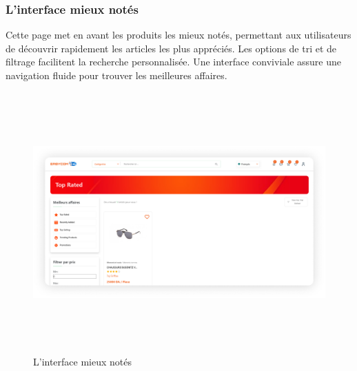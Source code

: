 \documentclass[edit,12pt,a4paper,ChapStyle,oneside,doubleinterligne]{report}
\begin{document}
\subsubsection{L'interface mieux notés}
Cette page met en avant les produits les mieux notés, permettant aux utilisateurs de découvrir rapidement les articles les plus appréciés. Les options de tri et de filtrage facilitent la recherche personnalisée. Une interface conviviale assure une navigation fluide pour trouver les meilleures affaires.
  \begin{figure} [H]
    \centering
    \includegraphics[width = 15.319375cm , height = 10cm , angle=360]{images/afficher les annonce 1.png}
    \caption{L'interface mieux notés}
    \label{fig:mieux notés}
\end{figure}
\end{document}
